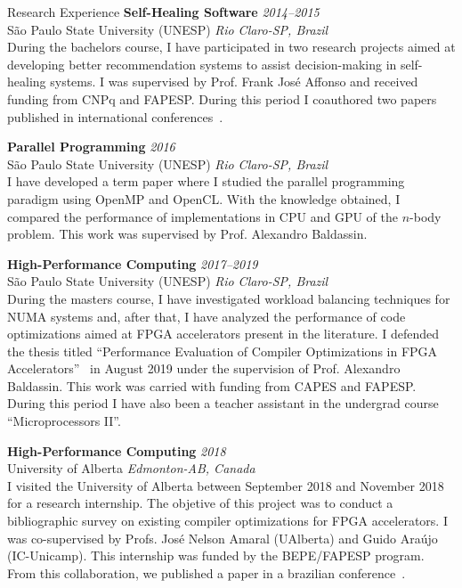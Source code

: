 \documentclass{resume}
\begin{document}
\begin{rSection}{Research Experience}
{\bf Self-Healing Software} \hfill {\em 2014--2015} \\
{\sc São Paulo State University (UNESP)} \hfill {\em Rio Claro-SP, Brazil} \\
During the bachelors course, I have participated in two research projects aimed
at developing better recommendation systems to assist decision-making in
self-healing systems. I was supervised by Prof. Frank José Affonso and received
funding from CNPq and FAPESP. During this period I coauthored two papers
published in international conferences~\cite{SEKE16,SEKE15}.

{\bf Parallel Programming} \hfill {\em 2016} \\
{\sc São Paulo State University (UNESP)} \hfill {\em Rio Claro-SP, Brazil} \\
I have developed a term paper where I studied the parallel programming paradigm
using OpenMP and OpenCL. With the knowledge obtained, I compared the performance
of implementations in CPU and GPU of the $n$-body problem. This work
was supervised by Prof. Alexandro Baldassin.

{\bf High-Performance Computing} \hfill {\em 2017--2019} \\
{\sc São Paulo State University (UNESP)} \hfill {\em Rio Claro-SP, Brazil} \\
During the masters course, I have investigated workload balancing techniques for
NUMA systems and, after that, I have analyzed the performance of code
optimizations aimed at FPGA accelerators present in the literature. I defended
the thesis titled ``Performance Evaluation of Compiler Optimizations in FPGA
Accelerators''~\cite{Master19} in August 2019 under the supervision of Prof.
Alexandro Baldassin. This work was carried with funding from CAPES and FAPESP.
During this period I have also been a teacher assistant in the undergrad course
``Microprocessors II''.


{\bf High-Performance Computing} \hfill {\em 2018} \\
{\sc University of Alberta} \hfill {\em Edmonton-AB, Canada} \\
I visited the University of Alberta between September 2018 and November 2018 for
a research internship.  The objetive of this project was to conduct a
bibliographic survey on existing compiler optimizations for FPGA accelerators. I
was co-supervised by Profs. José Nelson Amaral (UAlberta) and Guido Araújo
(IC-Unicamp). This internship was funded by the BEPE/FAPESP program. From this
collaboration, we published a paper in a brazilian conference~\cite{WSCAD19}.
\end{rSection}
\end{document}
